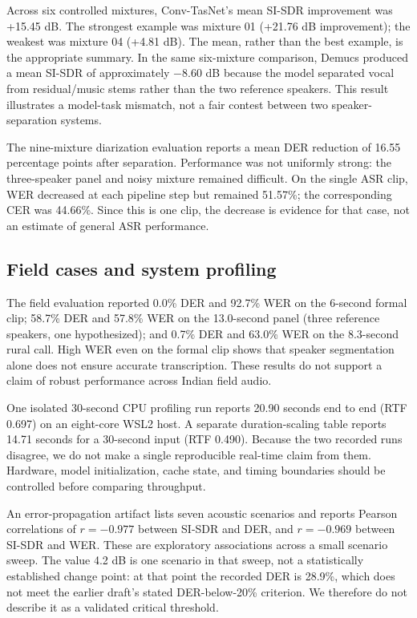 \documentclass[11pt,a4paper,twocolumn]{article}
\begin{document}
Across six controlled mixtures, Conv-TasNet's mean SI-SDR improvement was +15.45 dB. The strongest example was mixture 01 (+21.76 dB improvement); the weakest was mixture 04 (+4.81 dB). The mean, rather than the best example, is the appropriate summary. In the same six-mixture comparison, Demucs produced a mean SI-SDR of approximately $-8.60$ dB because the model separated vocal from residual/music stems rather than the two reference speakers. This result illustrates a model-task mismatch, not a fair contest between two speaker-separation systems.

The nine-mixture diarization evaluation reports a mean DER reduction of 16.55 percentage points after separation. Performance was not uniformly strong: the three-speaker panel and noisy mixture remained difficult. On the single ASR clip, WER decreased at each pipeline step but remained 51.57\%; the corresponding CER was 44.66\%. Since this is one clip, the decrease is evidence for that case, not an estimate of general ASR performance.

\subsection{Field cases and system profiling}
The field evaluation reported 0.0\% DER and 92.7\% WER on the 6-second formal clip; 58.7\% DER and 57.8\% WER on the 13.0-second panel (three reference speakers, one hypothesized); and 0.7\% DER and 63.0\% WER on the 8.3-second rural call. High WER even on the formal clip shows that speaker segmentation alone does not ensure accurate transcription. These results do not support a claim of robust performance across Indian field audio.

One isolated 30-second CPU profiling run reports 20.90 seconds end to end (RTF 0.697) on an eight-core WSL2 host. A separate duration-scaling table reports 14.71 seconds for a 30-second input (RTF 0.490). Because the two recorded runs disagree, we do not make a single reproducible real-time claim from them. Hardware, model initialization, cache state, and timing boundaries should be controlled before comparing throughput.

An error-propagation artifact lists seven acoustic scenarios and reports Pearson correlations of $r=-0.977$ between SI-SDR and DER, and $r=-0.969$ between SI-SDR and WER. These are exploratory associations across a small scenario sweep. The value 4.2 dB is one scenario in that sweep, not a statistically established change point: at that point the recorded DER is 28.9\%, which does not meet the earlier draft's stated DER-below-20\% criterion. We therefore do not describe it as a validated critical threshold.
\end{document}
